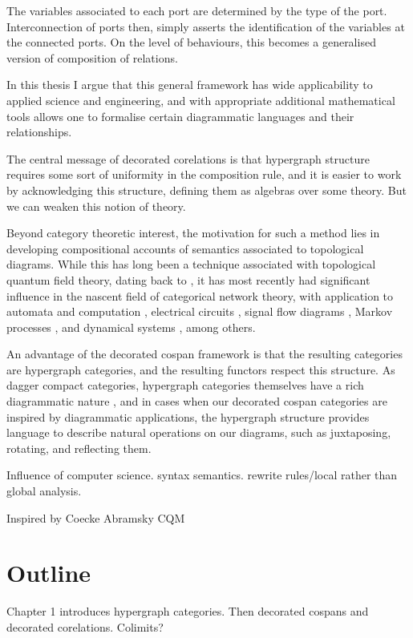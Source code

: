 
The variables associated to each port are determined by the type of the port.
Interconnection of ports then, simply asserts the identification of the
variables at the connected ports. On the level of behaviours, this becomes a
generalised version of composition of relations.

In this thesis I argue that this general framework has wide applicability to
applied science and engineering, and with appropriate additional mathematical
tools allows one to formalise certain diagrammatic languages and their
relationships.

The central message of decorated corelations is that hypergraph structure
requires some sort of uniformity in the composition rule, and it is easier to
work by acknowledging this structure, defining them as algebras over some
theory. But we can weaken this notion of theory.

Beyond category theoretic interest, the motivation for such a method lies in
developing compositional accounts of semantics associated to topological
diagrams. While this has long been a technique associated with topological
quantum field theory, dating back to \cite{At}, it has most recently had
significant influence in the nascent field of categorical network theory, with
application to automata and computation \cite{KSW2, Sp}, electrical circuits
\cite{BF}, signal flow diagrams \cite{BSZ, BE}, Markov processes \cite{BP,
ASW}, and dynamical systems \cite{VSL}, among others. 

An advantage of the decorated cospan framework is that the resulting categories
are hypergraph categories, and the resulting functors respect this structure.
As dagger compact categories, hypergraph categories themselves have a rich
diagrammatic nature \cite{Se}, and in cases when our decorated cospan categories
are inspired by diagrammatic applications, the hypergraph structure provides
language to describe natural operations on our diagrams, such as juxtaposing,
rotating, and reflecting them.

Influence of computer science. syntax semantics. rewrite rules/local rather than
global analysis.

Inspired by Coecke Abramsky CQM

\section{Outline}
Chapter 1 introduces hypergraph categories. Then decorated cospans and decorated
corelations. Colimits?

